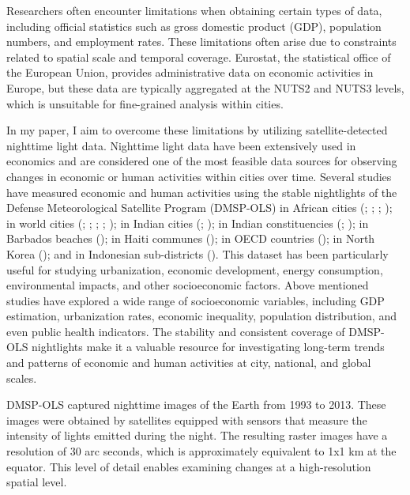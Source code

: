 \documentclass[12pt]{article}    %
\begin{document}
\par Researchers often encounter limitations when  obtaining certain types of data, including official statistics such as gross domestic product (GDP), population numbers, and employment rates. These limitations often arise due to constraints related to spatial scale and temporal coverage. Eurostat, the statistical office of the European Union, provides administrative data on economic activities in Europe, but these data are typically aggregated at the NUTS2 and NUTS3 levels, which is unsuitable for fine-grained analysis within cities.


\par In my paper, I aim to overcome these limitations by utilizing satellite-detected nighttime light data. Nighttime light data have been extensively used in economics and are considered one of the most feasible data sources for observing changes in economic or human activities within cities over time. Several studies have measured economic and human activities using the stable nightlights of the Defense Meteorological Satellite Program (DMSP-OLS) in African cities (\citealp{michalopoulos2014national}; \citealp{storeygard2016farther}; \citealp{eberhard2019regional}; \citealp{dreher2019african});  in world cities (\citealp{hodler2014regional}; \citealp{duben2021population}; \citealp{kocornik2020flooded}; \citealp{mamo2019intensive}; \citealp{lessmann2017regional}); in Indian cities (\citealp{gibson2015urban}; \citealp{castello2018higher}); in Indian constituencies (\citealp{baskaran2018women}; \citealp{prakash2019night}); in Barbados beaches (\citealp{corral2017impact}); in Haiti communes (\citealp{mitnik2018bright}); in  OECD countries (\citealp{smith2018left}); in North Korea (\citealp{lee2018international}); and in Indonesian sub-districts (\citealp{heger2019impact}). This dataset has been particularly useful for studying urbanization, economic development, energy consumption, environmental impacts, and other socioeconomic factors. Above mentioned studies have explored a wide range of socioeconomic variables, including GDP estimation, urbanization rates, economic inequality, population distribution, and even public health indicators. The stability and consistent coverage of DMSP-OLS nightlights make it a valuable resource for investigating long-term trends and patterns of economic and human activities at city, national, and global scales.

\par DMSP-OLS captured nighttime images of the Earth from 1993 to 2013. These images were obtained by satellites equipped with sensors that measure the intensity of lights emitted during the night. The resulting raster images have a resolution of 30 arc seconds, which is approximately equivalent to 1x1 km at the equator. This level of detail enables examining changes at a high-resolution spatial level.
\end{document}
